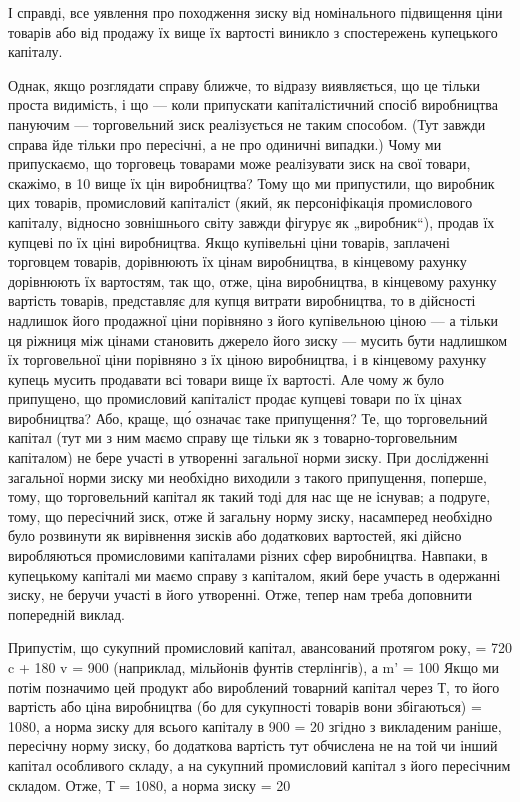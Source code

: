 І справді, все уявлення про походження зиску від номінального
підвищення ціни товарів або від продажу їх вище їх вартості
виникло з спостережень купецького капіталу.

Однак, якщо розглядати справу ближче, то відразу виявляється,
що це тільки проста видимість, і що — коли припускати
капіталістичний спосіб виробництва пануючим — торговельний
зиск реалізується не таким способом. (Тут завжди справа
йде тільки про пересічні, а не про одиничні випадки.) Чому
ми припускаємо, що торговець товарами може реалізувати зиск
на свої товари, скажімо, в 10%
вище їх цін виробництва? Тому що ми припустили, що виробник
цих товарів, промисловий капіталіст (який, як персоніфікація
промислового капіталу, відносно зовнішнього світу завжди
фігурує як „виробник“), продав їх купцеві по їх ціні виробництва.
Якщо купівельні ціни товарів, заплачені торговцем товарів, дорівнюють
їх цінам виробництва, в кінцевому рахунку дорівнюють
їх вартостям, так що, отже, ціна виробництва, в кінцевому рахунку
вартість товарів, представляє для купця витрати виробництва, то
в дійсності надлишок його продажної ціни порівняно з його купівельною
ціною — а тільки ця ріжниця між цінами становить джерело
його зиску — мусить бути надлишком їх торговельної ціни
порівняно з їх ціною виробництва, і в кінцевому рахунку купець
мусить продавати всі товари вище їх вартості. Але чому ж було
припущено, що промисловий капіталіст продає купцеві товари по
їх цінах виробництва? Або, краще, що́ означає таке припущення?
Те, що торговельний капітал (тут ми з ним маємо справу
ще тільки як з товарно-торговельним капіталом) не бере участі
в утворенні загальної норми зиску. При дослідженні загальної
норми зиску ми необхідно виходили з такого припущення, поперше,
тому, що торговельний капітал як такий тоді для нас
ще не існував; а подруге, тому, що пересічний зиск, отже й загальну
норму зиску, насамперед необхідно було розвинути як
вирівнення зисків або додаткових вартостей, які дійсно виробляються
промисловими капіталами різних сфер виробництва.
Навпаки, в купецькому капіталі ми маємо справу з капіталом,
який бере участь в одержанні зиску, не беручи участі в його
утворенні. Отже, тепер нам треба доповнити попередній виклад.

Припустім, що сукупний промисловий капітал, авансований
протягом року, = 720 c + 180 v = 900 (наприклад, мільйонів фунтів
стерлінгів), а m' = 100%
Якщо ми потім позначимо цей продукт або вироблений товарний
капітал через Т, то його вартість або ціна виробництва
(бо для сукупності товарів вони збігаються) = 1080, а норма
зиску для всього капіталу в 900 = 20%
згідно з викладеним раніше, пересічну норму зиску, бо додаткова
вартість тут обчислена не на той чи інший капітал особливого
складу, а на сукупний промисловий капітал з його пересічним
складом. Отже, Т = 1080, а норма зиску = 20%
